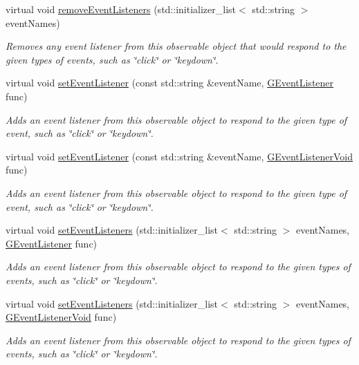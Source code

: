 \begin{DoxyCompactItemize}
virtual void \mbox{\hyperlink{classsgl_1_1GObservable_af51cc35c29a1bd1908609d432decdbb6}{remove\+Event\+Listeners}} (std\+::initializer\+\_\+list$<$ std\+::string $>$ event\+Names)
\begin{DoxyCompactList}\small\item\em Removes any event listener from this observable object that would respond to the given types of events, such as \char`\"{}click\char`\"{} or \char`\"{}keydown\char`\"{}. \end{DoxyCompactList}\item 
virtual void \mbox{\hyperlink{classsgl_1_1GObservable_ad2f6d34961c50f6c1e0659990b79f741}{set\+Event\+Listener}} (const std\+::string \&event\+Name, \mbox{\hyperlink{namespacesgl_ae9f3e9eab70035da1a2b114e21357b25}{G\+Event\+Listener}} func)
\begin{DoxyCompactList}\small\item\em Adds an event listener from this observable object to respond to the given type of event, such as \char`\"{}click\char`\"{} or \char`\"{}keydown\char`\"{}. \end{DoxyCompactList}\item 
virtual void \mbox{\hyperlink{classsgl_1_1GObservable_abac4cb9f9e626e010e87f5d91573c8a5}{set\+Event\+Listener}} (const std\+::string \&event\+Name, \mbox{\hyperlink{namespacesgl_a54427ce97bb1c2804e4fe2b0a62e8b17}{G\+Event\+Listener\+Void}} func)
\begin{DoxyCompactList}\small\item\em Adds an event listener from this observable object to respond to the given type of event, such as \char`\"{}click\char`\"{} or \char`\"{}keydown\char`\"{}. \end{DoxyCompactList}\item 
virtual void \mbox{\hyperlink{classsgl_1_1GObservable_afa388d69c33c718cf035774604065604}{set\+Event\+Listeners}} (std\+::initializer\+\_\+list$<$ std\+::string $>$ event\+Names, \mbox{\hyperlink{namespacesgl_ae9f3e9eab70035da1a2b114e21357b25}{G\+Event\+Listener}} func)
\begin{DoxyCompactList}\small\item\em Adds an event listener from this observable object to respond to the given types of events, such as \char`\"{}click\char`\"{} or \char`\"{}keydown\char`\"{}. \end{DoxyCompactList}\item 
virtual void \mbox{\hyperlink{classsgl_1_1GObservable_a7867184bbb686f74fae8a4db927da799}{set\+Event\+Listeners}} (std\+::initializer\+\_\+list$<$ std\+::string $>$ event\+Names, \mbox{\hyperlink{namespacesgl_a54427ce97bb1c2804e4fe2b0a62e8b17}{G\+Event\+Listener\+Void}} func)
\begin{DoxyCompactList}\small\item\em Adds an event listener from this observable object to respond to the given types of events, such as \char`\"{}click\char`\"{} or \char`\"{}keydown\char`\"{}. \end{DoxyCompactList}\end{DoxyCompactItemize}


